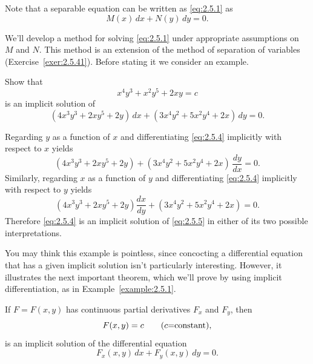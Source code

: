 Note that a separable equation can be written as \eqref{eq:2.5.1} as
\[
  M(x)\,dx+N(y)\,dy=0.
\]

We'll develop a method for solving \eqref{eq:2.5.1} under appropriate assumptions on $M$ and $N$.
This method is an extension of the method of separation of variables (Exercise~\ref{exer:2.5.41}).
Before stating it we consider an example.

\begin{example}
  \label{example:2.5.1} \rm Show that
  \begin{equation}
    \label{eq:2.5.4}x^{4}y^{3}+x^{2}y^{5}+2xy=c
  \end{equation}
  is an implicit solution of
  \begin{equation}
    \label{eq:2.5.5}(4x^{3}y^{3}+2xy^{5}+2y)\,dx+(3x^{4}y^{2}+5x^{2}y^{4}+2x)\,dy=0.
  \end{equation}
\end{example}

\begin{examplesolution}
\solution Regarding $y$ as a function of $x$ and differentiating \eqref{eq:2.5.4} implicitly with
respect to $x$ yields
\[
  (4x^{3}y^{3}+2xy^{5}+2y)+(3x^{4}y^{2}+5x^{2}y^{4}+2x)\,\frac{dy}{dx}=0.
\]
Similarly, regarding $x$ as a function of $y$ and differentiating \eqref{eq:2.5.4} implicitly with
respect to $y$ yields
\[
  (4x^{3}y^{3}+2xy^{5}+2y)\frac{dx}{dy}+(3x^{4}y^{2}+5x^{2}y^{4}+2x)=0.
\]
Therefore \eqref{eq:2.5.4} is an implicit solution of \eqref{eq:2.5.5} in either of its two possible
interpretations. \bbox
\end{examplesolution}

You may think this example is pointless, since concocting a differential equation that has a given
implicit solution isn't particularly interesting. However, it illustrates the next important
theorem, which we'll prove by using implicit differentiation, as in Example~\ref{example:2.5.1}.

\begin{theorem}
  \color{blue}
  \label{thmtype:2.5.1} If $F=F(x,y)$ has continuous partial derivatives $F_{x}$ and $F_{y}$, then
  \begin{equation}
    \label{eq:2.5.6}F(x,y)=c\qquad\mbox{{\rm(}$c$=constant\mbox{)}},
  \end{equation}
  is an implicit solution of the differential equation
  \begin{equation}
    \label{eq:2.5.7}F_{x}(x,y)\,dx+F_{y}(x,y)\,dy=0.
  \end{equation}
\end{theorem}

